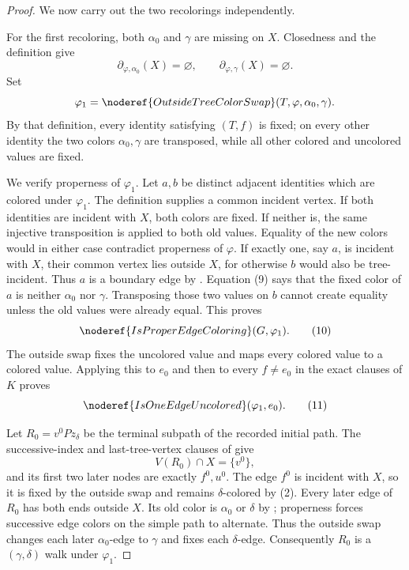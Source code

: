 \begin{proof}
We now carry out the two recolorings independently.

For the first recoloring, both $\alpha _0$ and $\gamma$ are missing on
$X$.  Closedness and the definition  give
\[
 \partial_{\varphi,\alpha _0}(X)=\varnothing,
 \qquad \partial_{\varphi,\gamma}(X)=\varnothing.            \tag{9}
\]
Set
\[
 \varphi_1=\noderef{OutsideTreeColorSwap}
   (T,\varphi,\alpha _0,\gamma).
\]
By that definition, every identity satisfying
$(T,f)$ is fixed; on every other identity the
two colors $\alpha _0,\gamma$ are transposed, while all other colored and
uncolored values are fixed.

We verify properness of $\varphi_1$.  Let $a,b$ be distinct adjacent
identities which are colored under $\varphi_1$.  The definition
 supplies a common incident vertex.  If both
identities are incident with $X$, both colors are fixed.  If neither is,
the same injective transposition is applied to both old values.  Equality
of the new colors would in either case contradict properness of
$\varphi$.  If exactly one, say $a$, is incident with $X$, their common
vertex lies outside $X$, for otherwise $b$ would also be tree-incident.
Thus $a$ is a boundary edge by .  Equation (9)
says that the fixed color of $a$ is neither $\alpha _0$ nor $\gamma$.
Transposing those two values on $b$ cannot create equality unless the old
values were already equal.  This proves
\[
 \noderef{IsProperEdgeColoring}(G,\varphi_1).                 \tag{10}
\]
The outside swap fixes the uncolored value and maps every colored value
to a colored value.  Applying this to $e_0$ and then to every
$f\ne e_0$ in the exact clauses of $K$ proves
\[
 \noderef{IsOneEdgeUncolored}(\varphi_1,e_0).                 \tag{11}
\]

Let $R_0=v^0Pz_\delta$ be the terminal subpath of the recorded initial
path.  The successive-index and last-tree-vertex clauses of
 give
\[
 V(R_0)\cap X=\{v^0\},                                      \tag{12}
\]
and its first two later nodes are exactly $f^0,u^0$.  The edge $f^0$ is
incident with $X$, so it is fixed by the outside swap and remains
$\delta$-colored by (2).  Every later edge of $R_0$ has both ends outside
$X$.  Its old color is $\alpha _0$ or $\delta$ by
; properness forces successive edge
colors on the simple path to alternate.  Thus the outside swap changes
each later $\alpha _0$-edge to $\gamma$ and fixes each $\delta$-edge.
Consequently $R_0$ is a $(\gamma,\delta)$ walk under $\varphi_1$.


\end{proof}
